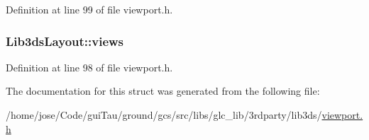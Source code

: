Definition at line 99 of file viewport.\-h.

\hypertarget{struct_lib3ds_layout_a60d2ac0330e9fdc6531c5a0d55a7233f}{
\subsubsection[{views}]{ Lib3ds\-Layout\-::views}}\label{struct_lib3ds_layout_a60d2ac0330e9fdc6531c5a0d55a7233f}


Definition at line 98 of file viewport.\-h.



The documentation for this struct was generated from the following file\-:\begin{DoxyCompactItemize}
\item 
/home/jose/\-Code/gui\-Tau/ground/gcs/src/libs/glc\-\_\-lib/3rdparty/lib3ds/\hyperlink{viewport_8h}{viewport.\-h}\end{DoxyCompactItemize}
